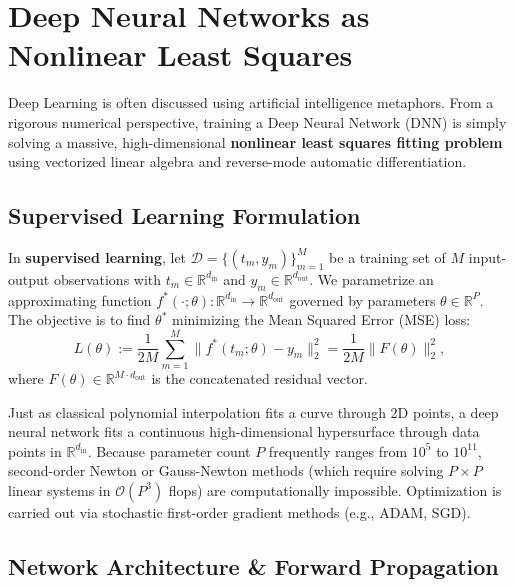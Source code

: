 \section{Deep Neural Networks as Nonlinear Least Squares}

Deep Learning is often discussed using artificial intelligence metaphors. From a rigorous numerical perspective, training a Deep Neural Network (DNN) is simply solving a massive, high-dimensional \textbf{nonlinear least squares fitting problem} using vectorized linear algebra and reverse-mode automatic differentiation.

\subsection{Supervised Learning Formulation}

\begin{definition}
    In \textbf{supervised learning}, let $\mathcal{D} = \{ (t_m, y_m) \}_{m=1}^{M}$ be a training set of $M$ input-output observations with $t_m \in \mathbb{R}^{d_{\text{in}}}$ and $y_m \in \mathbb{R}^{d_{\text{out}}}$. We parametrize an approximating function $f^*(\cdot; \theta): \mathbb{R}^{d_{\text{in}}} \to \mathbb{R}^{d_{\text{out}}}$ governed by parameters $\theta \in \mathbb{R}^P$. The objective is to find $\theta^*$ minimizing the Mean Squared Error (MSE) loss:
    \begin{equation}
        L(\theta) := \frac{1}{2M} \sum_{m=1}^{M} \|f^*(t_m; \theta) - y_m\|_2^2 = \frac{1}{2M} \|F(\theta)\|_2^2,
    \end{equation}
    where $F(\theta) \in \mathbb{R}^{M \cdot d_{\text{out}}}$ is the concatenated residual vector.
\end{definition}

Just as classical polynomial interpolation fits a curve through 2D points, a deep neural network fits a continuous high-dimensional hypersurface through data points in $\mathbb{R}^{d_{\text{in}}}$. Because parameter count $P$ frequently ranges from $10^5$ to $10^{11}$, second-order Newton or Gauss-Newton methods (which require solving $P \times P$ linear systems in $\mathcal{O}(P^3)$ flops) are computationally impossible. Optimization is carried out via stochastic first-order gradient methods (e.g., ADAM, SGD).

\subsection{Network Architecture \& Forward Propagation}

